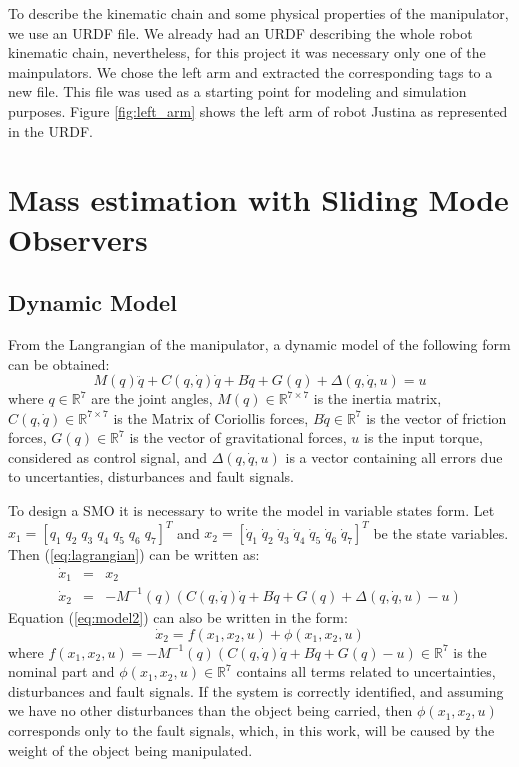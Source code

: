 \documentclass[a4paper, 10pt]{article}
\begin{document}
To describe the kinematic chain and some physical properties of the manipulator, we use an URDF file. We already had an URDF describing the whole robot kinematic chain, nevertheless, for this project it was necessary only one of the mainpulators. We chose the left arm and extracted the corresponding tags to a new file. This file was used as a starting point for modeling and simulation purposes. Figure \ref{fig:left_arm} shows the left arm of robot Justina as represented in the URDF.

\section{Mass estimation with Sliding Mode Observers}
\label{sec:estimation}

\subsection{Dynamic Model}
  From the Langrangian of the manipulator, a dynamic model of the following form can be obtained:
  \begin{equation}
    M(q)\ddot{q} + C(q, \dot{q})\dot{q} + B\dot{q} + G(q) + \Delta(q,\dot{q}, u) = u
    \label{eq:lagrangian}
  \end{equation}
  where $q\in \mathbb{R}^7$ are the joint angles, $M(q)\in \mathbb{R}^{7\times 7}$ is the inertia matrix, $C(q,\dot{q})\in \mathbb{R}^{7\times 7}$ is the Matrix of Coriollis forces, $B\dot{q}\in \mathbb{R}^7$ is the vector of friction forces, $G(q)\in\mathbb{R}^7$ is the vector of gravitational forces, $u$ is the input torque, considered as control signal, and $\Delta(q,\dot{q},u)$ is a vector containing all errors due to uncertanties, disturbances and fault signals.
  
  To design a SMO it is necessary to write the model in variable states form. Let $x_1 = [q_1\;q_2\;q_3\;q_4\;q_5\;q_6\;q_7]^T$ and $x_2 = [\dot{q}_1\;\dot{q}_2\;\dot{q}_3\;\dot{q}_4\;\dot{q}_5\;\dot{q}_6\;\dot{q}_7]^T$ be the state variables. Then (\ref{eq:lagrangian}) can be written as:
  \begin{eqnarray}
    \dot{x}_1 &=& x_2\label{eq:model1}\\
    \dot{x}_2 &=& -M^{-1}(q)\left(C(q, \dot{q})\dot{q} + B\dot{q} + G(q) + \Delta(q,\dot{q},u) - u\right)\label{eq:model2}
  \end{eqnarray}
Equation (\ref{eq:model2}) can also be written in the form:
  \begin{equation*}
    \dot{x}_2 = f(x_1, x_2, u) + \phi(x_1, x_2, u)
  \end{equation*}
  where $f(x_1, x_2, u) = -M^{-1}(q)\left(C(q, \dot{q})\dot{q} + B\dot{q} + G(q) - u\right) \in \mathbb{R}^7$ is the nominal part and $\phi(x_1, x_2, u) \in \mathbb{R}^7$ contains all terms related to uncertainties, disturbances and fault signals. If the system is correctly identified, and assuming we have no other disturbances than the object being carried, then $\phi(x_1, x_2, u)$ corresponds only to the fault signals, which, in this work, will be caused by the weight of the object being manipulated.
\end{document}
